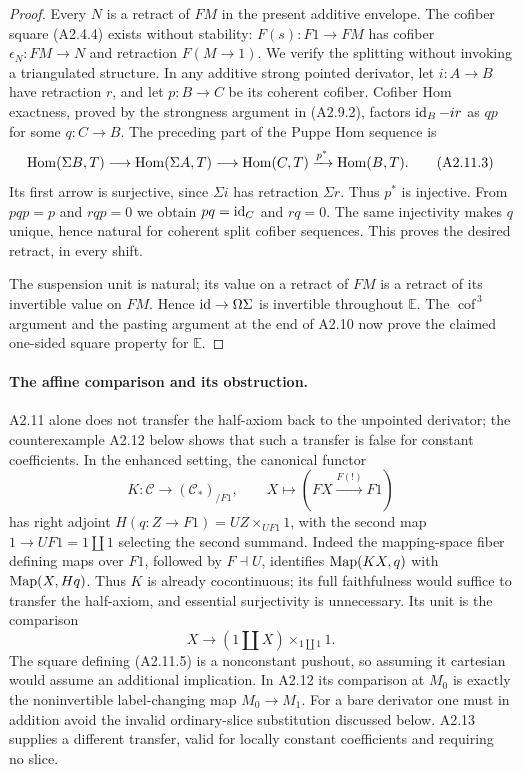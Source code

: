 \begin{proof}
Every $N$ is a retract of $FM$ in the present additive envelope.
The cofiber square (A2.4.4) exists without stability:
$F(s):F1\to FM$ has cofiber $\epsilon_N:FM\to N$ and retraction
$F(M\to1)$. We verify the splitting without invoking a triangulated
structure. In any additive strong pointed derivator, let $i:A\to B$ have
retraction $r$, and let $p:B\to C$ be its coherent cofiber. Cofiber Hom
exactness, proved by the strongness argument in (A2.9.2), factors
$\operatorname{id}_B-ir$ as $qp$ for some $q:C\to B$. The preceding part of the
Puppe Hom sequence is
\[
 \operatorname{Hom}(\Sigma B,T)\longrightarrow\operatorname{Hom}(\Sigma A,T)
 \longrightarrow\operatorname{Hom}(C,T)\xrightarrow{p^*}\operatorname{Hom}(B,T).
 \tag{A2.11.3}
\]
Its first arrow is surjective, since $\Sigma i$ has retraction $\Sigma r$.
Thus $p^*$ is injective. From $pqp=p$ and $rqp=0$ we obtain
$pq=\operatorname{id}_C$ and $rq=0$. The same injectivity makes $q$ unique, hence
natural for coherent split cofiber sequences. This proves the desired
retract, in every shift.

The suspension unit is natural; its value on a retract of $FM$ is a
retract of its invertible value on $FM$. Hence $\operatorname{id}\to\Omega\Sigma$ is
invertible throughout $\mathbb E$. The $\operatorname{cof}^{\,3}$
argument and the pasting argument at the end of A2.10 now prove the
claimed one-sided square property for $\mathbb E$.
\end{proof}

\paragraph{The affine comparison and its obstruction.}
A2.11 alone does not transfer the half-axiom back to the unpointed
derivator; the counterexample A2.12 below shows that such a transfer is
false for constant coefficients. In the enhanced setting,
the canonical functor
\[
 K:\mathcal C\longrightarrow(\mathcal C_*)_{/F1},
 \qquad X\longmapsto(FX\xrightarrow{F(!)}F1)
 \tag{A2.11.4}
\]
has right adjoint $H(q:Z\to F1)=UZ\times_{UF1}1$, with the second map
$1\to UF1=1\amalg1$ selecting the second summand. Indeed the mapping-space
fiber defining maps over $F1$, followed by $F\dashv U$, identifies
$\operatorname{Map}(KX,q)$ with $\operatorname{Map}(X,Hq)$. Thus $K$ is already cocontinuous;
its full faithfulness would suffice to transfer the half-axiom, and
essential surjectivity is unnecessary. Its unit is the comparison
\[
 X\longrightarrow (1\amalg X)\times_{1\amalg1}1.
 \tag{A2.11.5}
\]
The square defining (A2.11.5) is a nonconstant pushout, so assuming it
cartesian would assume an additional implication. In A2.12 its comparison
at $M_0$ is exactly the noninvertible label-changing map $M_0\to M_1$.
For a bare derivator one must in addition avoid the invalid
ordinary-slice substitution discussed below. A2.13 supplies a different
transfer, valid for locally constant coefficients and requiring no slice.

